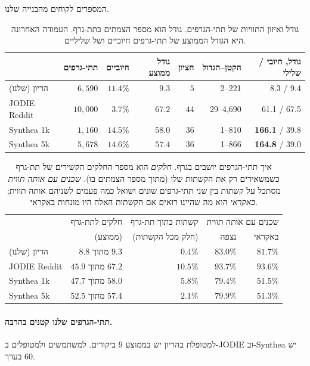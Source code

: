 \documentclass[11pt]{article}
\newcommand{\en}[1]{\foreignlanguage{english}{#1}}
\begin{document}
המספרים לקוחים מהבנייה שלנו.

\begin{table}[H]
\centering
\small
\begin{tabular}{lrrrrrr}
\toprule
 & תתי-גרפים & חיוביים & גודל ממוצע & חציון & הקטן--הגדול & גודל, חיובי / שלילי \\
\midrule
הריון (שלנו) & $6{,}590$ & $11.4\%$ & $9.3$ & $5$ & \en{2--221} & \en{8.3 / 9.4} \\
\en{JODIE Reddit} & $10{,}000$ & $3.7\%$ & $67.2$ & $44$ & \en{29--4,690} & \en{61.1 / 67.5} \\
\en{Synthea 1k} & $1{,}160$ & $14.5\%$ & $58.0$ & $36$ & \en{1--810} & \en{\textbf{166.1} / 39.8} \\
\en{Synthea 5k} & $5{,}678$ & $14.6\%$ & $57.4$ & $36$ & \en{1--866} & \en{\textbf{164.8} / 39.0} \\
\bottomrule
\end{tabular}
\caption{גודל ואיזון התוויות של תתי-הגרפים. גודל הוא מספר הצמתים בתת-גרף. העמודה האחרונה היא
הגודל הממוצע של תתי-גרפים חיוביים ושל שליליים.}
\end{table}

\begin{table}[H]
\centering
\small
\begin{tabular}{lrrrr}
\toprule
 & חלקים לתת-גרף & קשתות בתוך תת-גרף & \multicolumn{2}{c}{שכנים עם אותה תווית} \\
 & (ממוצע) & (חלק מכל הקשתות) & נצפה & באקראי \\
\midrule
הריון (שלנו) & $8.8$ מתוך $9.3$ & $0.4\%$ & $83.0\%$ & $81.7\%$ \\
\en{JODIE Reddit} & $45.9$ מתוך $67.2$ & $10.5\%$ & $93.7\%$ & $93.6\%$ \\
\en{Synthea 1k} & $47.7$ מתוך $58.0$ & $5.8\%$ & $79.4\%$ & $51.5\%$ \\
\en{Synthea 5k} & $52.5$ מתוך $57.4$ & $2.1\%$ & $79.9\%$ & $51.3\%$ \\
\bottomrule
\end{tabular}
\caption{איך תתי-הגרפים יושבים בגרף. \emph{חלקים} הוא מספר החלקים הקשירים של תת-גרף כשמשאירים
רק את הקשתות שלו (מתוך מספר הצמתים בו). \emph{שכנים עם אותה תווית} מסתכל על קשתות בין שני
תתי-גרפים שונים ושואל כמה פעמים לשניהם אותה תווית; \emph{באקראי} הוא מה שהיינו רואים אם הקשתות
האלה היו מונחות באקראי.}
\end{table}

\paragraph{תתי-הגרפים שלנו קטנים בהרבה.} למטופלת בהריון יש בממוצע $9$ ביקורים. למשתמשים
ולמטופלים ב-\en{JODIE} וב-\en{Synthea} יש בערך $60$.
\end{document}
